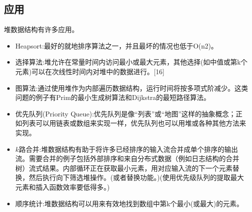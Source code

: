 \subsection{应用}
堆数据结构有许多应用。
\begin{itemize}
\item Heapsort:最好的就地排序算法之一，并且最坏的情况也低于O(n2)。
\item 选择算法:堆允许在常量时间内访问最小或最大元素，其他选择(如中值或第k个元素)可以在次线性时间内对堆中的数据进行。[16]
\item 图算法:通过使用堆作为内部遍历数据结构，运行时间将按多项式阶减少。这类问题的例子有Prim的最小生成树算法和Dijkstra的最短路径算法。
\item 优先队列(Priority Queue):优先队列是像“列表”或“地图”这样的抽象概念；正如列表可以用链表或数组来实现一样，优先队列也可以用堆或各种其他方法来实现。
\item $k$路合并:堆数据结构有助于将许多已经排序的输入流合并成单个排序的输出流。需要合并的例子包括外部排序和来自分布式数据（例如日志结构的合并树）流式结果。内部循环正在获取最小元素，用对应输入流的下一个元素替换，然后执行向下筛选堆操作。(或者替换功能。)(使用优先级队列的提取最大元素和插入函数效率要低得多。)
\item 顺序统计:堆数据结构可以用来有效地找到数组中第k个最小(或最大)的元素。
\end{itemize}
